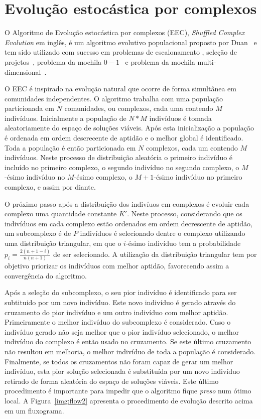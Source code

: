 \section{Evolução estocástica por complexos}


O Algoritmo de Evolução estocástica por complexos (EEC),
\emph{Shuffled Complex Evolution} em inglês,
é um algoritmo evolutivo populacional proposto por Duan~\cite{duan1992effective}
e tem sido utilizado com sucesso em problemas de escalonamento
\cite{zhao2015shuffled}, seleção de projetos~\cite{elbeltagi2007modified},
problema da mochila $0-1$~\cite{bhattacharjee2014shuffled} e
problema da mochila multi-dimensional~\cite{baroni2015shuffled,baroni2016shuffled}.

O EEC é inspirado na evolução natural que ocorre de forma simultânea em
comunidades independentes.
O algoritmo trabalha com uma população particionada em $N$ comunidades,
ou complexos, cada uma contendo $M$ indivíduos.
Inicialmente a população de $N*M$ indivíduos é tomada aleatoriamente do espaço
de soluções viáveis.
Após esta inicialização a população é ordenada em ordem descrecente de aptidão
e o melhor global é identificado.
Toda a população é então particionada em $N$ complexos, cada um contendo $M$ indivíduos.
Neste processo de distribuição aleatória o primeiro indivíduo é incluído
no primeiro complexo, o segundo indivíduo no segundo complexo, o $M$-ésimo
indivíduo no $M$-ésimo complexo, o $M+1$-ésimo indivíduo no primeiro complexo,
e assim por diante.

O próximo passo após a distribuição dos indivíuos em complexos é evoluir cada
complexo uma quantidade constante $K'$.
Neste processo, considerando que os indivíduos em cada complexo estão ordenados
em ordem decrescente de aptidão, um subcomplexo é de $P$ indivíduos é selecionado
dentre o complexo utilizando uma distribuição triangular, em que o $i$-ésimo
indivíduo tem a probabilidade $p_i = \frac{2(n+1-i)}{n(n+1)}$ de ser selecionado.
A utilização da distribuição triangular tem por objetivo priorizar os indivíduos
com melhor aptidão, favorecendo assim a convergência do algoritmo.

Após a seleção do subcomplexo, o seu pior indivíduo é identificado para ser
subtituido por um novo indivíduo.
Este novo indivíduo é gerado através do cruzamento do pior indivíduo e um outro
indivíduo com melhor aptidão.
Primeiramente o melhor indivíduo do subcomplexo é considerado.
Caso o indivíduo gerado não seja melhor que o pior indivíduo selecionado,
o melhor indivíduo do complexo é então usado no cruzamento.
Se este último cruzamento não resultou em melhoria, o melhor indivíduo de toda
a população é considerado.
Finalmente, se todos os cruzamentos não foram capaz de gerar um melhor indivíduo,
esta pior solução selecionada é substituída por um novo indivíduo retirado de
forma aleatória do espaço de soluções viáveis.
Este último procedimento é importante para impedir que o algoritmo fique
\emph{preso} num ótimo local.
A Figura~\ref{img:flow2} apresenta o procedimento de evolução descrito acima
em um fluxograma.

